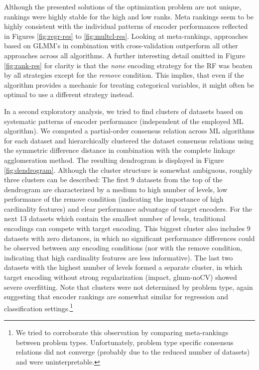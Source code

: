 \documentclass[smallextended]{svjour3}       %
\begin{document}
Although the presented solutions of the optimization problem are not unique, rankings were highly stable for the high and low ranks.
Meta rankings seem to be highly consistent with the individual patterns of encoder performances reflected in Figures \ref{fig:regr-res} to \ref{fig:multcl-res}.
Looking at meta-rankings, approaches based on GLMM's in combination with cross-validation outperform all other approaches across all algorithms.
A further interesting detail omitted in Figure \ref{fig:rank-res} for clarity is that the \textit{none} encoding strategy for the RF was beaten by all strategies except for the \textit{remove} condition.
This implies, that even if the algorithm provides a mechanic for treating categorical variables, it might often be optimal to use a different strategy instead.

In a second exploratory analysis, we tried to find clusters of datasets based on systematic patterns of encoder performance (independent of the employed ML algorithm).
We computed a partial-order consensus relation across ML algorithms for each dataset and hierarchically clustered the dataset consensus relations using the symmetric difference distance in combination with the complete linkage agglomeration method.
The resulting dendrogram is displayed in Figure \ref{fig:dendrogram}.
Although the cluster structure is somewhat ambiguous, roughly three clusters can be described:
The first 9 datasets from the top of the dendrogram are characterized by a medium to high number of levels, low performance of the remove condition (indicating the importance of high cardinality features) and clear performance advantage of target encoders.
For the next 13 datasets which contain the smallest number of levels, traditional encodings can compete with target encoding.
This biggest cluster also includes 9 datasets with zero distances, in which no significant performance differences could be observed between any encoding conditions (nor with the remove condition, indicating that high cardinality features are less informative).
The last two datasets with the highest number of levels formed a separate cluster, in which target encoding without strong regularization (impact, glmm-noCV) showed severe overfitting.
Note that clusters were not determined by problem type, again suggesting that encoder rankings are somewhat similar for regression and classification settings.\footnote{We tried to corroborate this observation by comparing meta-rankings between problem types. Unfortunately, problem type specific consensus relations did not converge (probably due to the reduced number of datasets) and were uninterpretable.}
\end{document}
